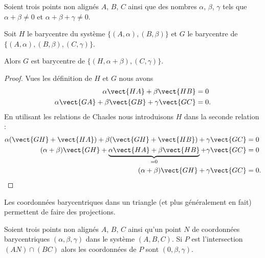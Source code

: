\begin{lemma}
    Soient trois points non alignés \( A\), \( B\), \( C\) ainsi que des nombres \( \alpha\), \( \beta\), \( \gamma\) tels que \( \alpha+\beta\neq 0 \) et \( \alpha+\beta+\gamma\neq 0\).

    Soit \( H\) le barycentre du système \( \{ (A,\alpha),(B,\beta) \}\) et \( G\) le barycentre de \( \{ (A,\alpha), (B,\beta),(C,\gamma) \}\).

    Alors \( G\) est barycentre de \( \{ (H,\alpha+\beta),(C,\gamma) \}\).
\end{lemma}

\begin{proof}
    Vues les définition de \( H\) et \( G\) nous avons
    \begin{subequations}
        \begin{align}
            \alpha\vect{ HA }+\beta\vect{ HB }&=0\\
            \alpha\vect{ GA }+\beta\vect{ GB }+\gamma\vect{ GC }&=0.
        \end{align}
    \end{subequations}
    En utilisant les relations de Chasles nous introduisons \( H\) dans la seconde relation :
    \begin{subequations}
        \begin{align}
            \alpha(\vect{ GH }+\vect{ HA })+\beta(\vect{ GH }+\vect{ HB })+\gamma\vect{ GC }&=0\\
            (\alpha+\beta)\vect{ GH }+\underbrace{  \alpha\vect{ HA }+\beta\vect{ HB }   }_{=0}+\gamma\vect{ GC }&=0\\
            (\alpha+\beta)\vect{ GH }+\gamma\vect{ GC }&=0.
        \end{align}
    \end{subequations}
\end{proof}

Les coordonnées barycentriques dans un triangle (et plus généralement en fait) permettent de faire des projections.

\begin{proposition}     \label{PROPooBCUVooWKttiH}
    Soient trois points non alignés \( A\), \( B\), \( C\) ainsi qu'un point \( N\) de coordonnées barycentriques  \( (\alpha,\beta,\gamma) \) dans le système $(A,B,C)$. Si \( P\) est l'intersection \( (AN)\cap(BC)\) alors les coordonnées de \( P\) sont \( (0,\beta,\gamma)\).
\end{proposition}

